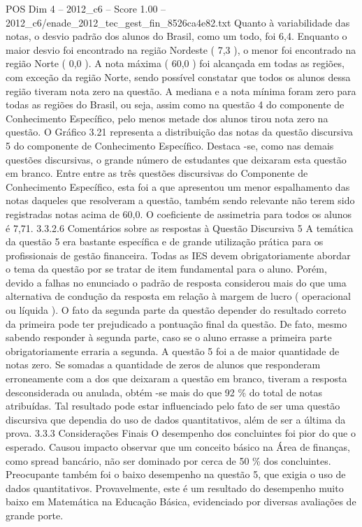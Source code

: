 \begin{textsample}{POS Dim 4 – 2012\_c6 – Score 1.00 – 2012\_c6/enade\_2012\_tec\_gest\_fin\_8526ca4e82.txt}
Quanto à variabilidade das notas, o desvio padrão dos alunos do Brasil, como um todo, foi 6,4.
Enquanto o maior desvio foi encontrado na região Nordeste ( 7,3 ), o menor foi encontrado na região Norte ( 0,0 ).
A nota máxima ( 60,0 ) foi alcançada em todas as regiões, com exceção da região Norte, sendo possível constatar que todos os alunos dessa região tiveram nota zero na questão.
A mediana e a nota mínima foram zero para todas as regiões do Brasil, ou seja, assim como na questão 4 do componente de Conhecimento Específico, pelo menos metade dos alunos tirou nota zero na questão.
O Gráfico 3.21 representa a distribuição das notas da questão discursiva 5 do componente de Conhecimento Específico.
Destaca -se, como nas demais questões discursivas, o grande número de estudantes que deixaram esta questão em branco.
Entre entre as três questões discursivas do Componente de Conhecimento Específico, esta foi a que apresentou um menor espalhamento das notas daqueles que resolveram a questão, também sendo relevante não terem sido registradas notas acima de 60,0.
O coeficiente de assimetria para todos os alunos é 7,71. 3.3.2.6 Comentários sobre as respostas à Questão Discursiva 5 A temática da questão 5 era bastante específica e de grande utilização prática para os profissionais de gestão financeira.
Todas as IES devem obrigatoriamente abordar o tema da questão por se tratar de item fundamental para o aluno.
Porém, devido a falhas no enunciado o padrão de resposta considerou mais do que uma alternativa de condução da resposta em relação à margem de lucro ( operacional ou líquida ).
O fato da segunda parte da questão depender do resultado correto da primeira pode ter prejudicado a pontuação final da questão.
De fato, mesmo sabendo responder à segunda parte, caso se o aluno errasse a primeira parte obrigatoriamente erraria a segunda.
A questão 5 foi a de maior quantidade de notas zero.
Se somadas a quantidade de zeros de alunos que responderam erroneamente com a dos que deixaram a questão em branco, tiveram a resposta desconsiderada ou anulada, obtém -se mais do que 92 \% do total de notas atribuídas.
Tal resultado pode estar influenciado pelo fato de ser uma questão discursiva que dependia do uso de dados quantitativos, além de ser a última da prova. 3.3.3 Considerações Finais O desempenho dos concluintes foi pior do que o esperado.
Causou impacto observar que um conceito básico na Área de finanças, como spread bancário, não ser dominado por cerca de 50 \% dos concluintes.
Preocupante também foi o baixo desempenho na questão 5, que exigia o uso de dados quantitativos.
Provavelmente, este é um resultado do desempenho muito baixo em Matemática na Educação Básica, evidenciado por diversas avaliações de grande porte.

\end{textsample}
